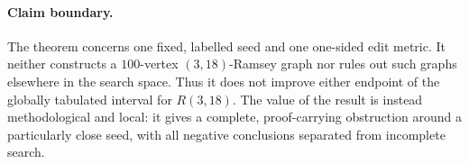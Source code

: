 \paragraph{Claim boundary.}
The theorem concerns one fixed, labelled seed and one one-sided edit metric.
It neither constructs a \(100\)-vertex \((3,18)\)-Ramsey graph nor rules out
such graphs elsewhere in the search space.  Thus it does not improve either
endpoint of the globally tabulated interval for \(R(3,18)\).  The value of the
result is instead methodological and local: it gives a complete,
proof-carrying obstruction around a particularly close seed, with all
negative conclusions separated from incomplete search.
